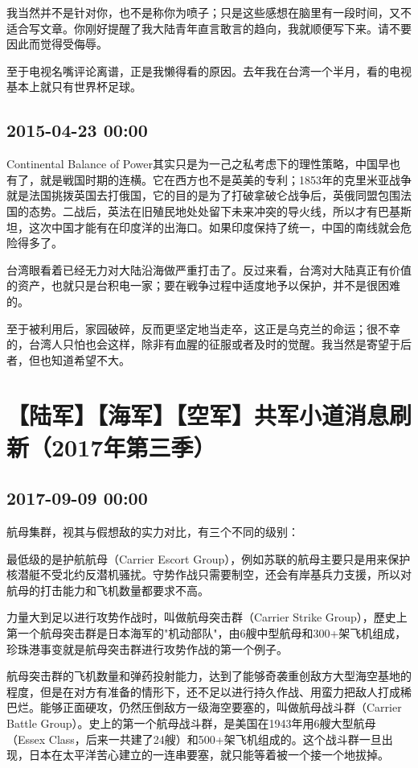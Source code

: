 \documentclass[twocolumn]{ctexart}
\begin{document}
我当然并不是针对你，也不是称你为喷子；只是这些感想在脑里有一段时间，又不适合写文章。你刚好提醒了我大陆青年直言敢言的趋向，我就顺便写下来。请不要因此而觉得受侮辱。

至于电视名嘴评论离谱，正是我懒得看的原因。去年我在台湾一个半月，看的电视基本上就只有世界杯足球。\subsection*{2015-04-23 00:00}
Continental Balance of Power其实只是为一己之私考虑下的理性策略，中国早也有了，就是戦国时期的连横。它在西方也不是英美的专利；1853年的克里米亚战争就是法国挑拨英国去打俄国，它的目的是为了打破拿破仑战争后，英俄同盟包围法国的态势。二战后，英法在旧殖民地处处留下未来冲突的导火线，所以才有巴基斯坦，这次中国才能有在印度洋的出海口。如果印度保持了统一，中国的南线就会危险得多了。

台湾眼看着已经无力对大陆沿海做严重打击了。反过来看，台湾对大陆真正有价值的资产，也就只是台积电一家；要在戦争过程中适度地予以保护，并不是很困难的。

至于被利用后，家园破碎，反而更坚定地当走卒，这正是乌克兰的命运；很不幸的，台湾人只怕也会这样，除非有血腥的征服或者及时的觉醒。我当然是寄望于后者，但也知道希望不大。\section*{【陆军】【海军】【空军】共军小道消息刷新（2017年第三季）}
\subsection*{2017-09-09 00:00}
航母集群，视其与假想敌的实力对比，有三个不同的级别：

最低级的是护航航母（Carrier Escort Group），例如苏联的航母主要只是用来保护核潜艇不受北约反潜机骚扰。守势作战只需要制空，还会有岸基兵力支援，所以对航母的打击能力和飞机数量都要求不高。

力量大到足以进行攻势作战时，叫做航母突击群（Carrier Strike Group），歷史上第一个航母突击群是日本海军的"机动部队"，由6艘中型航母和300+架飞机组成，珍珠港事变就是航母突击群进行攻势作战的第一个例子。

航母突击群的飞机数量和弹药投射能力，达到了能够奇袭重创敌方大型海空基地的程度，但是在对方有准备的情形下，还不足以进行持久作战、用蛮力把敌人打成稀巴烂。能够正面硬攻，仍然压倒敌方一级海空要塞的，叫做航母战斗群（Carrier Battle Group）。史上的第一个航母战斗群，是美国在1943年用6艘大型航母（Essex Class，后来一共建了24艘）和500+架飞机组成的。这个战斗群一旦出现，日本在太平洋苦心建立的一连串要塞，就只能等着被一个接一个地拔掉。
\end{document}
